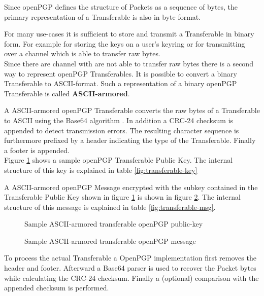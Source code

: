 Since openPGP defines the structure of Packets as a sequence of bytes, the primary representation of a Transferable is also in byte format.

For many use-cases it is sufficient to store and transmit a Transferable in binary form. For example for storing the keys on a user's keyring or for transmitting over a channel which is able to transfer raw bytes. \\


Since there are channel with are not able to transfer raw bytes there is a second way to represent openPGP Transferables. It is possible to convert a binary Transferable to ASCII-format. Such a representation of a binary openPGP Transferable is called \textbf{ASCII-armored}.

A ASCII-armored openPGP Transferable converts the raw bytes of a Transferable to ASCII using the Base64 algorithm \citep{RFC4648}. In addition a CRC-24 \cite[section 6.1]{RFC4880} checksum is appended to detect transmission errors. The resulting character sequence is furthermore prefixed by a header indicating the type of the Transferable. Finally a footer is appended. \\

Figure \ref{fig:key} shows a sample openPGP Transferable Public Key. The internal structure of this key is explained in table \ref{fig:transferable-key}

A ASCII-armored openPGP Message encrypted with the subkey contained in the Transferable Public Key shown in figure \ref{fig:key} is shown in figure \ref{fig:msg}. The internal structure of this message is explained in table \ref{fig:transferable-msg}. \\

\begin{figure}[p]
	\centering
	
	\caption{Sample ASCII-armored transferable openPGP public-key}
	\label{fig:key}
\end{figure}

\begin{figure}[p]
	\centering
	
	\caption{Sample ASCII-armored transferable openPGP message}
	\label{fig:msg}
\end{figure}

To process the actual Transferable a OpenPGP implementation first removes the header and footer. Afterward a Base64 parser is used to recover the Packet bytes while calculating the CRC-24 checksum. Finally a (optional) comparison with the appended checksum is performed.



